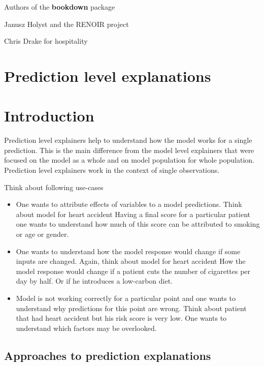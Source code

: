 \documentclass[]{krantz}
\providecommand{\tightlist}{%
  \setlength{\itemsep}{0pt}\setlength{\parskip}{0pt}}
\theoremstyle{definition}
\theoremstyle{definition}
\theoremstyle{definition}
\theoremstyle{remark}
\begin{document}
Authors of the \textbf{bookdown} package \citep{R-bookdown}

Janusz Holyst and the RENOIR project

Chris Drake for hospitality

\hypertarget{prediction-level-explanations}{%
\section*{Prediction level
explanations}\label{prediction-level-explanations}}

\hypertarget{PredictionExplainers}{%
\section{Introduction}\label{PredictionExplainers}}

Prediction level explainers help to understand how the model works for a
single prediction. This is the main difference from the model level
explainers that were focused on the model as a whole and on model
population for whole population. Prediction level explainers work in the
context of single observations.

Think about following use-cases

\begin{itemize}
\tightlist
\item
  One wants to attribute effects of variables to a model predictions.
  Think about model for heart accident Having a final score for a
  particular patient one wants to understand how much of this score can
  be attributed to smoking or age or gender.
\item
  One wants to understand how the model response would change if some
  inputs are changed. Again, think about model for heart accident How
  the model response would change if a patient cuts the number of
  cigarettes per day by half. Or if he introduces a low-carbon diet.
\item
  Model is not working correctly for a particular point and one wants to
  understand why predictions for this point are wrong. Think about
  patient that had heart accident but his risk score is very low. One
  wants to understand which factors may be overlooked.
\end{itemize}

\hypertarget{approaches-to-prediction-explanations}{%
\subsection{Approaches to prediction
explanations}\label{approaches-to-prediction-explanations}}
\end{document}
